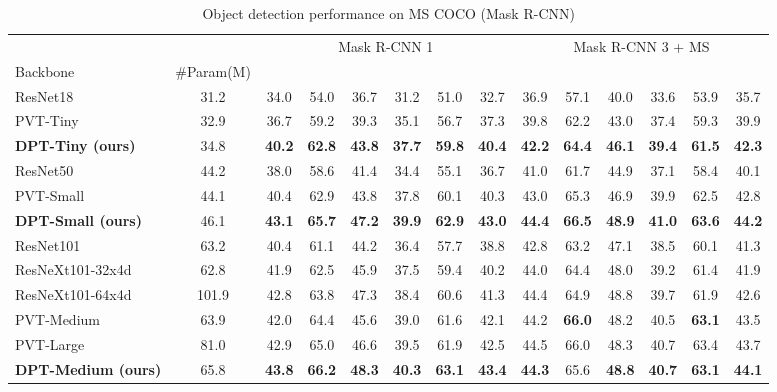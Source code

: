 \documentclass[sigconf,screen]{acmart}
\begin{document}
\begin{table*}
  \caption{Object detection performance on MS COCO (Mask R-CNN)}
  \label{tab:det_mask_result}
  \begin{tabular}{l|c|cccccc|cccccc}
    \toprule
    & & \multicolumn{6}{c}{Mask R-CNN 1} & \multicolumn{6}{c}{Mask R-CNN 3 + MS}\\
    Backbone & \#Param(M) &  &  &  &  &  &  &  &  &  &  &  & \\
    \midrule
    ResNet18 \cite{resnet}  & 31.2  & 34.0 & 54.0 & 36.7 & 31.2 & 51.0 & 32.7 & 36.9 & 57.1 & 40.0 & 33.6 & 53.9 & 35.7\\
    PVT-Tiny \cite{pvt}     & 32.9 & 36.7 & 59.2 & 39.3 & 35.1 & 56.7 & 37.3 & 39.8 & 62.2 & 43.0 & 37.4 & 59.3 & 39.9\\
    \textbf{DPT-Tiny (ours)}& 34.8 & \textbf{40.2} & \textbf{62.8} & \textbf{43.8} & \textbf{37.7} & \textbf{59.8} & \textbf{40.4} & \textbf{42.2} & \textbf{64.4} & \textbf{46.1} & \textbf{39.4} & \textbf{61.5} & \textbf{42.3}\\
    \midrule
    ResNet50 \cite{resnet}  & 44.2  & 38.0 & 58.6 & 41.4 & 34.4 & 55.1 & 36.7 & 41.0 & 61.7 & 44.9 & 37.1 & 58.4 & 40.1\\
    PVT-Small \cite{pvt}    & 44.1 & 40.4 & 62.9 & 43.8 & 37.8 & 60.1 & 40.3 & 43.0 & 65.3 & 46.9 & 39.9 & 62.5 & 42.8\\
    \textbf{DPT-Small (ours)}      & 46.1 & \textbf{43.1} & \textbf{65.7} & \textbf{47.2} & \textbf{39.9} & \textbf{62.9} & \textbf{43.0} & \textbf{44.4} & \textbf{66.5} & \textbf{48.9} & \textbf{41.0} & \textbf{63.6} & \textbf{44.2}\\
    \midrule
    ResNet101 \cite{resnet} & 63.2  & 40.4 & 61.1 & 44.2 & 36.4 & 57.7 & 38.8 & 42.8 & 63.2 & 47.1 & 38.5 & 60.1 & 41.3\\
    ResNeXt101-32x4d \cite{resnext} & 62.8 & 41.9 & 62.5 & 45.9 & 37.5 & 59.4 & 40.2 & 44.0 & 64.4 & 48.0 & 39.2 & 61.4 & 41.9\\
    ResNeXt101-64x4d \cite{resnext} & 101.9 & 42.8 & 63.8 & 47.3 & 38.4 & 60.6 & 41.3 & 44.4 & 64.9 & 48.8 & 39.7 & 61.9 & 42.6\\
    PVT-Medium \cite{pvt}           & 63.9 & 42.0 & 64.4 & 45.6 & 39.0 & 61.6 & 42.1 & 44.2 & \textbf{66.0} & 48.2 & 40.5 & \textbf{63.1} & 43.5\\
    PVT-Large \cite{pvt}            & 81.0  & 42.9 & 65.0 & 46.6 & 39.5 & 61.9 & 42.5 & 44.5 & 66.0 & 48.3 & 40.7 & 63.4 & 43.7\\
    \textbf{DPT-Medium (ours)}      & 65.8 & \textbf{43.8} & \textbf{66.2} & \textbf{48.3} & \textbf{40.3} & \textbf{63.1} & \textbf{43.4} & \textbf{44.3} & 65.6 & \textbf{48.8} & \textbf{40.7} & \textbf{63.1} & \textbf{44.1}\\
    \midrule
  \bottomrule
\end{tabular}
\end{table*}
\end{document}
